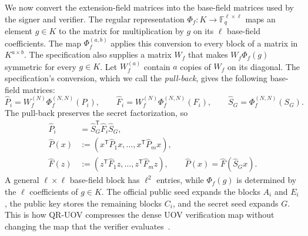 \documentclass[11pt,a4paper]{article}
\theoremstyle{definition}
\theoremstyle{remark}
\newcommand{\F}{\mathbb F}
\newcommand{\QRUOV}{\textsf{QR-UOV}}
\newcommand{\trans}{\mathsf T}
\begin{document}
We now convert the extension-field matrices into the base-field matrices used
by the signer and verifier.  The regular representation
$\Phi_f:K\to\F_q^{\ell\times\ell}$ maps an element $g\in K$ to the matrix for
multiplication by $g$ on its $\ell$ base-field coefficients.  The map
$\Phi_f^{(a,b)}$ applies this conversion to every block of a matrix in
$K^{a\times b}$.  The specification also supplies a matrix $W_f$ that makes
$W_f\Phi_f(g)$ symmetric for every $g\in K$.  Let $W_f^{(a)}$ contain $a$
copies of $W_f$ on its diagonal.  The specification's conversion, which we
call the \emph{pull-back}, gives the following base-field matrices:
\begin{equation}\label{eq:official-pullback}
 \widehat P_i=W_f^{(N)}\Phi_f^{(N,N)}(P_i),\qquad
 \widehat F_i=W_f^{(N)}\Phi_f^{(N,N)}(F_i),\qquad
 \widehat S_G=\Phi_f^{(N,N)}(S_G).
\end{equation}
The pull-back preserves the secret factorization, so
\begin{equation}\label{eq:base-factorization}
 \begin{aligned}
 \widehat P_i&=\widehat S_G^{\trans}\widehat F_i\widehat S_G,\\
 \widehat P(x)&:=(x^{\trans}\widehat P_1x,\ldots,
 x^{\trans}\widehat P_mx),\\
 \widehat F(z)&:=(z^{\trans}\widehat F_1z,\ldots,
 z^{\trans}\widehat F_mz),
 \qquad \widehat P(x)=\widehat F(\widehat S_Gx).
 \end{aligned}
\end{equation}
A general $\ell\times\ell$ base-field block has $\ell^2$ entries, while
$\Phi_f(g)$ is determined by the $\ell$ coefficients of $g\in K$.  The
official public seed expands the blocks $A_i$ and $E_i$, the public key stores
the remaining blocks $C_i$, and the secret seed expands $G$.  This is how
\QRUOV{} compresses the dense UOV verification map without changing the map
that the verifier evaluates~\cite{QRUOVOriginal,QRUOVSpec}.
\end{document}

